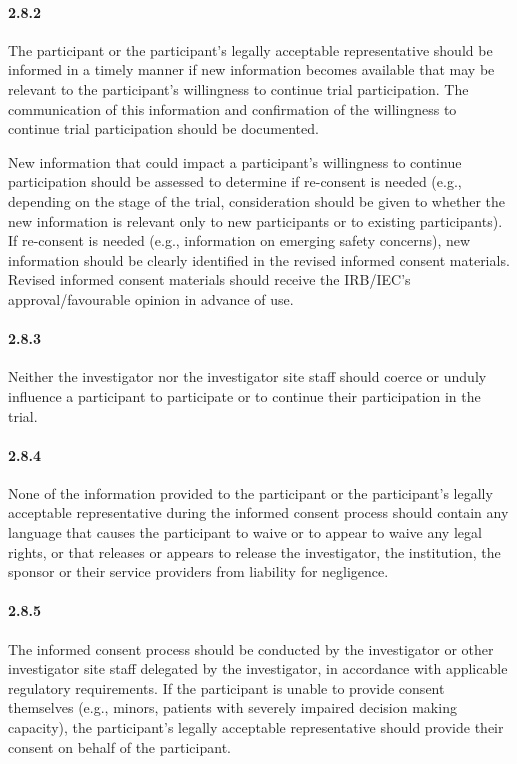 \documentclass[11pt]{article}
\begin{document}
\paragraph{2.8.2} The participant or the participant's legally acceptable representative should be informed in a timely manner if new information becomes available that may be relevant to the participant's willingness to continue trial participation. The communication of this information and confirmation of the willingness to continue trial participation should be documented.

New information that could impact a participant's willingness to continue participation should be assessed to determine if re-consent is needed (e.g., depending on the stage of the trial, consideration should be given to whether the new information is relevant only to new participants or to existing participants). If re-consent is needed (e.g., information on emerging safety concerns), new information should be clearly identified in the revised informed consent materials. Revised informed consent materials should receive the IRB/IEC's approval/favourable opinion in advance of use.


\paragraph{2.8.3} Neither the investigator nor the investigator site staff should coerce or unduly influence a participant to participate or to continue their participation in the trial.

\paragraph{2.8.4} None of the information provided to the participant or the participant's legally acceptable representative during the informed consent process should contain any language that causes the participant to waive or to appear to waive any legal rights, or that releases or appears to release the investigator, the institution, the sponsor or their service providers from liability for negligence.

\paragraph{2.8.5} The informed consent process should be conducted by the investigator or other investigator site staff delegated by the investigator, in accordance with applicable regulatory requirements. If the participant is unable to provide consent themselves (e.g., minors, patients with severely impaired decision making capacity), the participant's legally acceptable representative should provide their consent on behalf of the participant.
\end{document}
